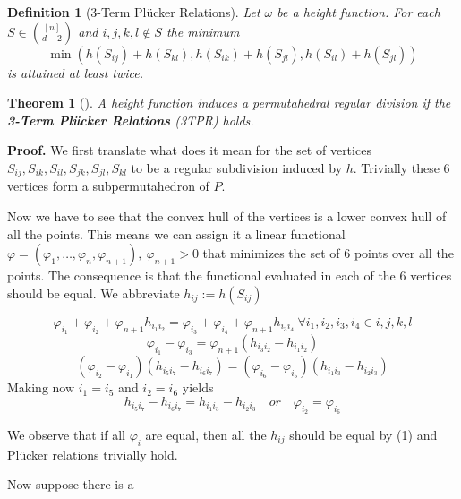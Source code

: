 \documentclass{myclass}
\newtheorem*{definition}{Definition}
\newtheorem*{theorem}{Theorem}
\begin{document}
\begin{definition}[3-Term Plücker Relations] Let $\omega $ be a height function.
For each $S\in \binom{[n]}{ d-2}$ and $i, j, k, l \not\in S$ the minimum
\[
\min (h(S_{ij}) + h(S_{kl}), h(S_{ik}) + h(S_{jl}), h(S_{il}) +  h(S_{jl}))
\] 
is attained at least twice.
\end{definition}

\begin{theorem}[] A height function induces a permutahedral regular division if the \textbf{3-Term Plücker Relations} (3TPR) holds.
\end{theorem}

\textbf{Proof.} 
We first translate what does it mean for the set of vertices $S_{ij}, S_{ik}, S_{il}, S_{jk}, S_{jl}, S_{kl}$ to be a regular subdivision induced by $h$. Trivially these 6 vertices form a subpermutahedron of  $P$. 

Now we have to see that the convex hull of the vertices is a lower convex hull of all the points. This means we can assign it a linear functional $\varphi = (\varphi _1, \ldots, \varphi_{n}, \varphi _{n+1}), \ \varphi _{n+1}>0$ that minimizes the set of 6 points over all the points. The consequence is that the functional evaluated in each of the 6 vertices should be equal. We abbreviate $h_{ij} := h(S_{ij})$

\begin{equation}
\varphi _{i_1} + \varphi _{i_2} + \varphi _{n+1}h_{i_{1}i_{2}} = \varphi _{i_3} + \varphi _{i_4} + \varphi _{n+1}h_{i_{3}i_{4}} \ \forall i_1, i_2 ,i_3, i_4 \in {i, j, k, l}
\end{equation}
\begin{equation}
\varphi _{i_1} - \varphi _{i_3} = \varphi _{n+1} (h_{i_3i_2}-h_{i_1i_2})
\end{equation}
\begin{equation}
  (\varphi _{i_2}-\varphi _{i_1})(h_{i_5i_7} - h_{i_6i_7}) = 
  (\varphi _{i_6}-\varphi _{i_5})(h_{i_1i_3} - h_{i_2i_3})
\end{equation}
Making now $i_1 = i_5$ and $i_2=i_6$ yields
\begin{equation}
h_{i_5i_7} - h_{i_{6}i_7} = h_{i_1i_3}-h_{i_2i_3} \quad or \quad \varphi _{i_2} = \varphi _{i_6}
\end{equation}

We observe that if all $\varphi _i$ are equal, then all the $h_{ij}$ should be equal by (1) and Plücker relations trivially hold.

Now suppose there is a
\end{document}
